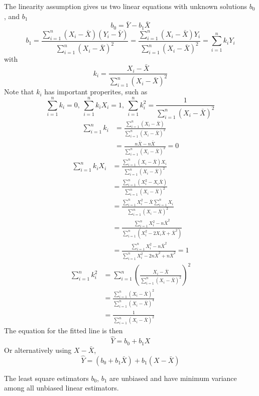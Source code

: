 The linearity assumption gives us two linear equations with unknown solutions $b_0$, and $b_1$
\[b_0 = \bar{Y} - b_1\bar{X}\]
\[b_1 = \frac{\sum_{i=1}^n (X_i - \bar{X})(Y_i - \bar{Y})}{\sum_{i=1}^n (X_i - \bar{X})^2 } = \frac{\sum_{i=1}^n(X_i -\bar{X})Y_i}{\sum_{i=1}^n(X_i-\bar{X})^2} = \sum_{i=1}^n k_iY_i\]
with 
\[k_i = \frac{X_i - \bar{X}}{\sum_{i=1}^n (X_i - \bar{X})^2}\]
Note that $k_i$ has important properites, such as 
\[\sum_{i=1}^n k_i = 0, \ \sum_{i=1}^n k_iX_i = 1,\ \sum_{i=1}^n k_i^2 = \frac{1}{\sum_{i=1}^n (X_i - \bar{X})^2}\]
\begin{align*}
    \sum_{i=1}^n k_i &= \frac{\sum_{i=1}^n (X_i - \bar{X})}{\sum_{i=1}^n (X_i - \bar{X})^2}\\
    &= \frac{n\bar{X} - n\bar{X}}{\sum_{i=1}^n (X_i-\bar{X})^2 } = 0
\end{align*}
\begin{align*}
    \sum_{i=1}^n k_iX_i &= \frac{\sum_{i=1}^n (X_i - \bar{X})X_i}{\sum_{i=1}^n (X_i - \bar{X})^2}\\
    &= \frac{\sum_{i=1}^n (X_i^2 - X_i\bar{X})}{\sum_{i=1}^n  (X_i - \bar{X})^2}\\
    &= \frac{\sum_{i=1}^n X_i^2 - \bar{X}\sum_{i=1}^n X_i}{\sum_{i=1}^n (X_i - \bar{X})^2}\\
    &= \frac{\sum_{i=1}^n X_i^2 - n\bar{X}^2}{\sum_{i=1}^n (X_i^2 - 2X_i\bar{X} + \bar{X}^2)}\\
    &= \frac{\sum_{i=1}^n X_i^2 - n\bar{X}^2}{\sum_{i=1}^n X_i^2 - 2n\bar{X}^2 + n\bar{X}^2} = 1
\end{align*}
\begin{align*}
    \sum_{i=1}^n k_i^2 &= \sum_{i=1}^n \left(\frac{X_i-\bar{X}}{\sum_{i=1}^n (X_i - \bar{X})^2}\right)^2\\
    &= \frac{\sum_{i=1}^n (X_i-\bar{X})^2}{\sum_{i=1}^n (X_i-\bar{X})^4}\\
    &= \frac{1}{\sum_{i=1}^n (X_i-\bar{X})^2}
\end{align*}
\noindent
The equation for the fitted line is then 
\[\hat{Y} = b_0 + b_1X\]
Or alternatively using $X - \bar{X}$, 
\[\hat{Y} = (b_0 + b_1\bar{X}) + b_1(X - \bar{X})\]

\begin{theorem}
    The least square estimators $b_0$, $b_1$ are unbiased and have minimum variance among all unbiased linear estimators.  
\end{theorem}

